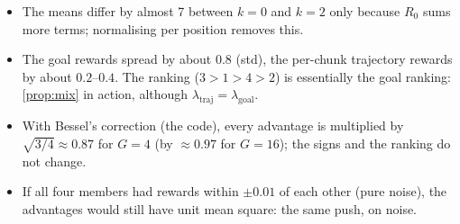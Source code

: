 \documentclass[11pt,a4paper]{article}
\theoremstyle{remark}
\begin{document}
\begin{itemize}
\item The means differ by almost 7 between $k=0$ and $k=2$ only because $R_0$ sums more terms; normalising per position removes this.
\item The goal rewards spread by about $0.8$ (std), the per-chunk trajectory rewards by about $0.2$--$0.4$. The ranking ($3>1>4>2$) is essentially the goal ranking: \cref{prop:mix} in action, although $\lambda_{\mathrm{traj}}=\lambda_{\mathrm{goal}}$.
\item With Bessel's correction (the code), every advantage is multiplied by $\sqrt{3/4}\approx0.87$ for $G=4$ (by $\approx0.97$ for $G=16$); the signs and the ranking do not change.
\item If all four members had rewards within $\pm0.01$ of each other (pure noise), the advantages would still have unit mean square: the same push, on noise.
\end{itemize}
\end{document}
